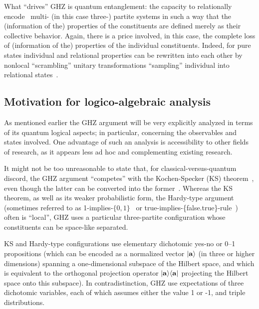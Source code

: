 \documentclass[sn-mathphys]{sn-jnl}%
\theoremstyle{thmstyleone}%
\theoremstyle{thmstyletwo}%
\theoremstyle{thmstylethree}%
\begin{document}
What ``drives'' GHZ is quantum entanglement: the capacity to relationally encode~\cite{schrodinger-gwsidqm2,zeil-99} multi- (in this case three-) partite systems
in such a way that the (information of the) properties of the constituents are defined merely as their collective behavior.
Again, there is a price involved, in this case, the complete loss of (information of the) properties of the individual constituents.
Indeed, for pure states individual and relational properties can be rewritten into each other by nonlocal ``scrambling''
unitary transformations ``sampling'' individual into relational states~\cite{svozil-2016-sampling}.

\subsection{Motivation for logico-algebraic analysis}

As mentioned earlier the GHZ argument will be very explicitly analyzed in terms of its quantum logical aspects;
in particular, concerning the observables and states involved.
One advantage of such an analysis is accessibility to other fields of research,
as it appears less ad hoc and complementing existing research.

It might not be too unreasonable to state that, for classical-versus-quantum discord, the GHZ argument ``competes'' with
the  Kochen-Specker (KS) theorem~\cite{kochen1,specker-ges},
even though the latter can be converted into the former~\cite{Xu-Chen-Guehnw-2020,cabello2020converting}.
Whereas the KS theorem, as well as its weaker probabilistic form,
the Hardy-type argument~\cite{Hardy-93,svozil-2020-hardy} (sometimes referred to as 1-implies-$\{0,1\}$~\cite{svozil-2006-omni} or true-implies-\{false.true\}-rule~\cite{2018-minimalYIYS})
often is ``local'', GHZ uses a particular three-partite configuration whose constituents can be space-like separated.

KS and Hardy-type configurations use elementary dichotomic yes-no or 0--1 propositions
(which can be encoded as a normalized vector $\vert {\bf a} \rangle$ (in three or higher dimensions)
spanning a one-dimensional subspace of the Hilbert space,
and which is equivalent to the orthogonal projection operator $\vert {\bf a} \rangle \langle {\bf a}\vert $
projecting the Hilbert space onto this subspace).
In contradistinction, GHZ use expectations of three dichotomic variables, each of which assumes either the value 1 or -1,
and triple distributions.
\end{document}
